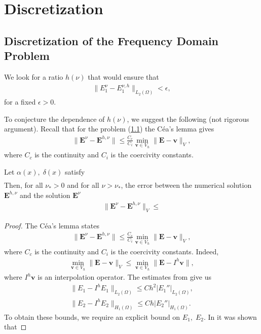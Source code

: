 
\section{Discretization}
\subsection{Discretization of the Frequency Domain Problem}

We look for a ratio $h(\nu)$ that would ensure that 
\begin{align*}
 \|E^{\nu}_{1}-E^{\nu,h}_{1}\|_{L_{2}(\Omega)}<\epsilon,
\end{align*}
for a fixed $\epsilon>0$. 

To conjecture the dependence of $h(\nu)$, we suggest the following (not rigorous argument). 
Recall that for the problem (\ref{}) the C\'ea's lemma gives
\begin{align*}
 \|\mathbf{E}^{\nu}-\mathbf{E}^{h,\nu}\|\leq \frac{C_c}{C_i}\min_{\mathbf{v}\in V_h}\|\mathbf{E}-\mathbf{v}\|_{V},
\end{align*}
where $C_c$ is the continuity and $C_i$ is the coercivity constants.
\begin{lemma}{}
Let $\alpha(x), \; \delta(x)$ satisfy
\begin{align*}
\end{align*}
Then, for all $\nu_*>0$ and for all $\nu>\nu_*$, the error between the numerical solution $\mathbf{E}^{h,\nu}$ and the 
solution $\mathbf{E}^{\nu}$
\begin{align*}
\|\mathbf{E}^{\nu}-\mathbf{E}^{h,\nu}\|_{V}\leq 
\end{align*}
\end{lemma}
\begin{proof}
The C\'ea's lemma states 
\begin{align*}
 \|\mathbf{E}^{\nu}-\mathbf{E}^{h,\nu}\|\leq \frac{C_c}{C_i}\min_{\mathbf{v}\in V_h}\|\mathbf{E}-\mathbf{v}\|_{V},
\end{align*}
where $C_c$ is the continuity and $C_i$ is the coercivity constants.
Indeed,
\begin{align*}
 \min_{\mathbf{v}\in V_h}\|\mathbf{E}-\mathbf{v}\|_{V}\leq \min_{\mathbf{v}\in V_h}\|\mathbf{E}-I^{h}\mathbf{v}\|,
\end{align*}
where $I^{h}\mathbf{v}$ is an interpolation operator. The estimates from \cite[Chapter 0]{Brenner_Scott} give us
\begin{align*}
 \|E_1-I^{h}E_1\|_{L_{2}(\Omega)}\leq Ch^2|E_1''|_{L_{2}(\Omega)},\\
 \|E_2-I^{h}E_2\|_{H_{1}(\Omega)}\leq Ch|E_2''|_{H_{1}(\Omega)}.
\end{align*}
To obtain these bounds, we require an explicit bound on $E_1, \; E_2$. In \cite{Despers et al Hybrid} 
it was shown that 
 


\end{proof}

